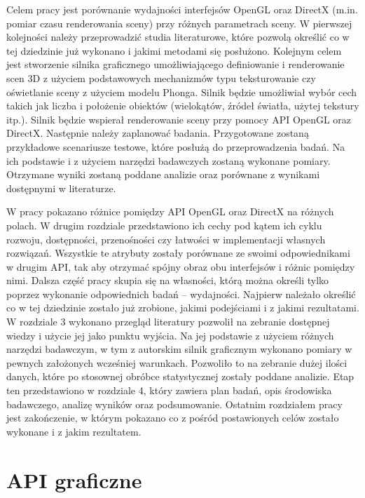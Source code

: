 \documentclass[archive]{mgr}
\begin{document}
Celem pracy jest porównanie wydajności interfejsów OpenGL oraz DirectX (m.in. pomiar czasu renderowania sceny) przy różnych parametrach sceny. W pierwszej kolejności należy przeprowadzić studia literaturowe, które pozwolą określić co w tej dziedzinie już wykonano i jakimi metodami się posłużono. Kolejnym celem jest stworzenie silnika graficznego umożliwiającego definiowanie i renderowanie scen 3D z użyciem podstawowych mechanizmów typu teksturowanie czy oświetlanie sceny z użyciem modelu Phonga. Silnik będzie umożliwiał wybór cech takich jak liczba i położenie obiektów (wielokątów, źródeł światła, użytej tekstury itp.). Silnik będzie wspierał renderowanie sceny przy pomocy API OpenGL oraz DirectX. Następnie należy zaplanować badania. Przygotowane zostaną przykładowe scenariusze testowe, które posłużą do przeprowadzenia badań. Na ich podstawie i z użyciem narzędzi badawczych zostaną wykonane pomiary. Otrzymane wyniki zostaną poddane analizie oraz porównane z wynikami dostępnymi w literaturze.
\newpage

W pracy pokazano różnice pomiędzy API OpenGL oraz DirectX na różnych polach. W drugim rozdziale przedstawiono ich cechy pod kątem ich cyklu rozwoju, dostępności, przenośności czy łatwości w implementacji własnych rozwiązań. Wszystkie te atrybuty zostały porównane ze swoimi odpowiednikami w drugim API, tak aby otrzymać spójny obraz obu interfejsów i różnic pomiędzy nimi. Dalsza część pracy skupia się na własności, którą można określi tylko poprzez wykonanie odpowiednich badań – wydajności. Najpierw należało określić co w tej dziedzinie zostało już zrobione, jakimi podejściami i z jakimi rezultatami. W rozdziale 3 wykonano przegląd literatury pozwolił na zebranie dostępnej wiedzy i użycie jej jako punktu wyjścia. Na jej podstawie z użyciem różnych narzędzi badawczym, w tym z autorskim silnik graficznym wykonano pomiary w pewnych założonych wcześniej warunkach. Pozwoliło to na zebranie dużej ilości danych, które po stosownej obróbce statystycznej zostały poddane analizie. Etap ten przedstawiono w rozdziale 4, który zawiera plan badań, opis środowiska badawczego, analizę wyników oraz podsumowanie. Ostatnim rozdziałem pracy jest zakończenie, w którym pokazano co z pośród postawionych celów zostało wykonane i z jakim rezultatem.





\chapter{API graficzne}
\end{document}

